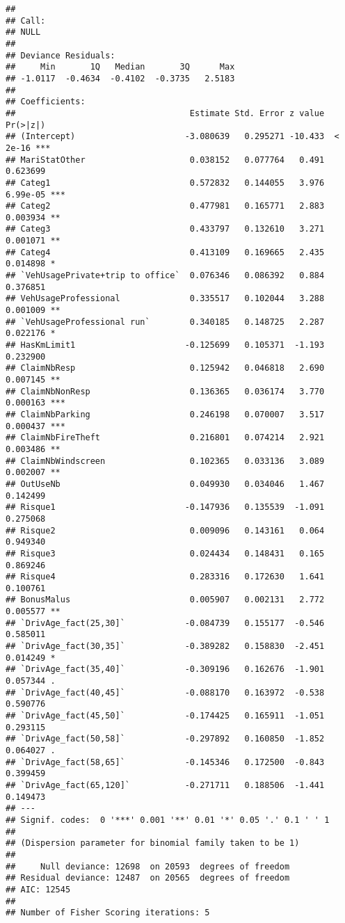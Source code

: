 \documentclass[
]{article}
\begin{document}
\begin{verbatim}
## 
## Call:
## NULL
## 
## Deviance Residuals: 
##     Min       1Q   Median       3Q      Max  
## -1.0117  -0.4634  -0.4102  -0.3735   2.5183  
## 
## Coefficients:
##                                   Estimate Std. Error z value Pr(>|z|)    
## (Intercept)                      -3.080639   0.295271 -10.433  < 2e-16 ***
## MariStatOther                     0.038152   0.077764   0.491 0.623699    
## Categ1                            0.572832   0.144055   3.976 6.99e-05 ***
## Categ2                            0.477981   0.165771   2.883 0.003934 ** 
## Categ3                            0.433797   0.132610   3.271 0.001071 ** 
## Categ4                            0.413109   0.169665   2.435 0.014898 *  
## `VehUsagePrivate+trip to office`  0.076346   0.086392   0.884 0.376851    
## VehUsageProfessional              0.335517   0.102044   3.288 0.001009 ** 
## `VehUsageProfessional run`        0.340185   0.148725   2.287 0.022176 *  
## HasKmLimit1                      -0.125699   0.105371  -1.193 0.232900    
## ClaimNbResp                       0.125942   0.046818   2.690 0.007145 ** 
## ClaimNbNonResp                    0.136365   0.036174   3.770 0.000163 ***
## ClaimNbParking                    0.246198   0.070007   3.517 0.000437 ***
## ClaimNbFireTheft                  0.216801   0.074214   2.921 0.003486 ** 
## ClaimNbWindscreen                 0.102365   0.033136   3.089 0.002007 ** 
## OutUseNb                          0.049930   0.034046   1.467 0.142499    
## Risque1                          -0.147936   0.135539  -1.091 0.275068    
## Risque2                           0.009096   0.143161   0.064 0.949340    
## Risque3                           0.024434   0.148431   0.165 0.869246    
## Risque4                           0.283316   0.172630   1.641 0.100761    
## BonusMalus                        0.005907   0.002131   2.772 0.005577 ** 
## `DrivAge_fact(25,30]`            -0.084739   0.155177  -0.546 0.585011    
## `DrivAge_fact(30,35]`            -0.389282   0.158830  -2.451 0.014249 *  
## `DrivAge_fact(35,40]`            -0.309196   0.162676  -1.901 0.057344 .  
## `DrivAge_fact(40,45]`            -0.088170   0.163972  -0.538 0.590776    
## `DrivAge_fact(45,50]`            -0.174425   0.165911  -1.051 0.293115    
## `DrivAge_fact(50,58]`            -0.297892   0.160850  -1.852 0.064027 .  
## `DrivAge_fact(58,65]`            -0.145346   0.172500  -0.843 0.399459    
## `DrivAge_fact(65,120]`           -0.271711   0.188506  -1.441 0.149473    
## ---
## Signif. codes:  0 '***' 0.001 '**' 0.01 '*' 0.05 '.' 0.1 ' ' 1
## 
## (Dispersion parameter for binomial family taken to be 1)
## 
##     Null deviance: 12698  on 20593  degrees of freedom
## Residual deviance: 12487  on 20565  degrees of freedom
## AIC: 12545
## 
## Number of Fisher Scoring iterations: 5
\end{verbatim}
\end{document}
